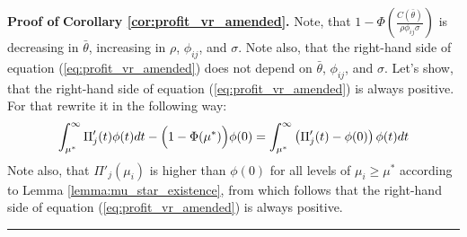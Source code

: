 \documentclass[12pt]{article}
\newenvironment{proof}[1][Proof of]{\noindent\textbf{#1} }{\ \rule{0.5em}{0.5em}}
\begin{document}
\begin{proof}
    \textbf{Corollary \ref{cor:profit_vr_amended}.}
    Note, that $1 - \Phi\left(\frac{C(\bar{\theta})}{\rho\phi_{ij}\sigma}\right)$ is decreasing in $\bar{\theta}$, increasing in $\rho$, $\phi_{ij}$, and $\sigma$. Note also, that the right-hand side of equation (\ref{eq:profit_vr_amended}) does not depend on $\bar{\theta}$, $\phi_{ij}$, and $\sigma$. Let's show, that the right-hand side of equation (\ref{eq:profit_vr_amended}) is always positive. For that rewrite it in the following way:
    \begin{equation*}
        \int^\infty_{\mu^*}\Pi'_j(t)\phi(t)dt 
        -
        \Bigl( 1 - \Phi (\mu^*)\Bigr) \phi(0) 
        = 
        \int^\infty_{\mu^*}\left(\Pi'_j(t)-\phi(0)\right)\phi(t)dt 
    \end{equation*}
    Note also, that $\Pi'_{j}(\mu_i)$ is higher than $\phi(0)$ for all levels of $\mu_i \geq \mu^*$ according to Lemma \ref{lemma:mu_star_existence}, from which follows that the right-hand side of equation (\ref{eq:profit_vr_amended}) is always positive.
\end{proof}
\end{document}
